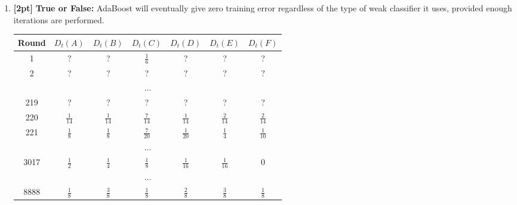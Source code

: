 \begin{enumerate}
    


 \item \textbf{[2pt]} 
    \textbf{True or False:} AdaBoost will eventually give zero training error regardless of the type of weak classifier it uses, provided enough iterations are performed.

    

\begin{table}[h]
\begin{center}
\begin{tabular}{ |c|c|c|c|c|c|c| } 
 \hline
 Round & $D_t(A)$ & $D_t(B)$ & $D_t(C)$ & $D_t(D)$ & $D_t(E)$ & $D_t(F)$ \\ [4pt]
  \hline
  \hline
 1 & ? & ? & $\frac{1}{6}$ & ? & ? & ? \\ [4pt]
  \hline
 2 & ? & ? & ? & ? & ? & ? \\ [4pt]
 \hline
\multicolumn{7}{|c|}{...}\\[4pt]
 \hline
 219 & ? & ? & ? & ? & ? & ? \\ [4pt]
  \hline 220 & $\frac{1}{14}$ & $\frac{1}{14}$ & $\frac{7}{14}$ & $\frac{1}{14}$ & $\frac{2}{14}$ & $\frac{2}{14}$ \\ [4pt]
   \hline
 221 & $\frac{1}{8}$ & $\frac{1}{8}$ & $\frac{7}{20}$ & $\frac{1}{20}$ & $\frac{1}{4}$ & $\frac{1}{10}$ \\ [4pt]
  \hline
\multicolumn{7}{|c|}{...}\\[4pt]
 \hline
  3017 & $\frac{1}{2}$ & $\frac{1}{4}$ & $\frac{1}{8}$ & $\frac{1}{16}$ & $\frac{1}{16}$ & 0 \\ [4pt]
   \hline
\multicolumn{7}{|c|}{...}\\[4pt]
 \hline
  8888 & $\frac{1}{8}$ & $\frac{3}{8}$ & $\frac{1}{8}$ & $\frac{2}{8}$ & $\frac{3}{8}$ & $\frac{1}{8}$ \\ [4pt]
   \hline
\end{tabular}
\end{center}
\end{table}  


\end{enumerate}
